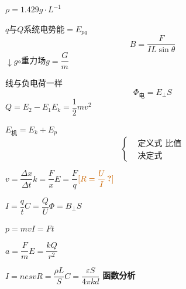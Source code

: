 $\rho=1.429\unit{g\cdot L^{-1}}$

$q$与$Q$系统电势能$=E_{pq}$
\[
B=\frac{F}{IL\sin\theta}
\]
$\downarrow g$\quad $\circ$\quad 重力场\qquad $g=\dfrac{G}{m}$

线与负电荷一样
\[
\Phi_{\text{电}}=E_{\perp}S
\]
$Q=E_2-E_1$\qquad $E_k=\dfrac12mv^2$

$E_{\text{机}}=E_k+E_p$
\[
\left\{\begin{aligned}
&\text{定义式\ \ 比值}\\[8pt]
&\text{决定式}
\end{aligned}\right.
\]

$v=\dfrac{\Delta x}{\Delta t}$\quad $k=\dfrac{F}{x}$\quad $E=\dfrac{F}{q}$\quad $\unclear{R=\dfrac{U}{I}}$ %

$I=\dfrac{q}{t}$\quad $C=\dfrac{Q}{U}$\quad $\Phi=B_{\perp}S$

\quad $p=mv$\quad $I=Ft$

\quad $a=\dfrac{F}{m}$\quad $E=\dfrac{kQ}{r^2}$

$I=nesv$\quad $R=\dfrac{\rho L}{S}$\quad $C=\dfrac{\varepsilon S}{4\pi kd}$
\textbf{函数分析}


